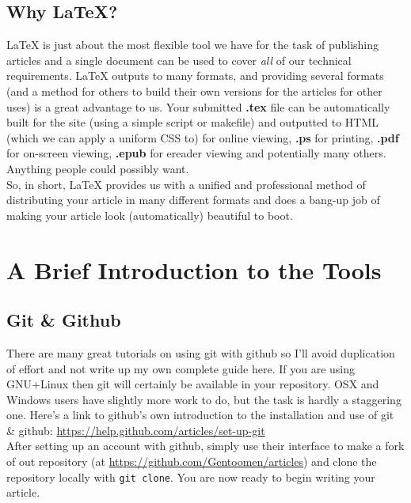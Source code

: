 \documentclass{article}
\begin{document}
\subsection{Why \LaTeX{}?}
 \LaTeX{} is just about the most flexible tool we have for the task of publishing articles and a single document can be used to cover \emph{all} of our technical requirements. \LaTeX{} outputs to many formats, and providing several formats (and a method for others to build their own versions for the articles for other uses) is a great advantage to us. Your submitted \textbf{.tex} file can be automatically built for the site (using a simple script or makefile) and outputted to HTML (which we can apply a uniform CSS to) for online viewing, \textbf{.ps} for printing, \textbf{.pdf} for on-screen viewing, \textbf{.epub} for ereader viewing and potentially many others. Anything people could possibly want. \\
 So, in short, \LaTeX{} provides us with a unified and professional method of distributing your article in many different formats and does a bang-up job of making your article look (automatically) beautiful to boot.

\section{A Brief Introduction to the Tools}
\subsection{Git \& Github}
  There are many great tutorials on using git with github so I'll avoid duplication of effort and not write up my own complete guide here. If you are using GNU+Linux then git will certainly be available in your repository. OSX and Windows users have slightly more work to do, but the task is hardly a staggering one. Here's a link to github's own introduction to the installation and use of git \& github: \url{https://help.github.com/articles/set-up-git} \\
  After setting up an account with github, simply use their interface to make a fork of out repository (at \url{https://github.com/Gentoomen/articles}) and clone the repository locally with \texttt{git clone}. You are now ready to begin writing your article.
\end{document}
